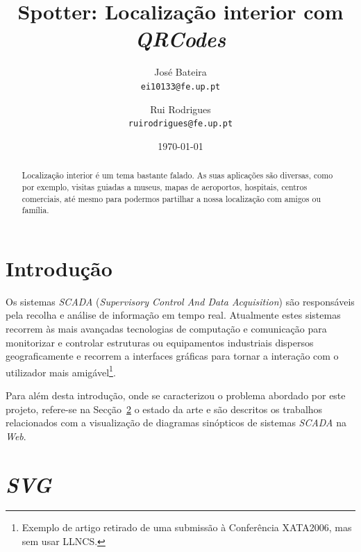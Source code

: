 \documentclass[twocolumn,twoside,11pt]{article}
\title{\vspace{-15mm}\fontsize{24pt}{10pt}\selectfont\textbf{
  Spotter: Localização interior com \emph{QRCodes}
}} %
\author{José Bateira\\
\small \texttt{ei10133@fe.up.pt}\\
\and
Rui Rodrigues\\
\small \texttt{ruirodrigues@fe.up.pt}
\vspace{-5mm}
}
\date{\today}
\newcommand{\class}[1]{{\normalfont\slshape #1\/}}
\newcommand{\svg}{\class{SVG}}
\newcommand{\scada}{\class{SCADA}}
\begin{document}
\maketitle
\thispagestyle{plain}            %


\begin{abstract}
Localização interior é um tema bastante falado. 
As suas aplicações são diversas, como por exemplo, visitas guiadas a museus, mapas de aeroportos, hospitais, centros comerciais, até mesmo para podermos partilhar a nossa localização com amigos ou família.



\end{abstract}


\section{Introdução}\label{sec:intro}

Os sistemas \scada{} (\emph{Supervisory Control And Data Acquisition})
são responsáveis pela recolha e análise de informação em tempo real.
Atualmente estes sistemas recorrem às mais avançadas tecnologias de
computação e comunicação para monitorizar e controlar estruturas ou
equipamentos industriais dispersos geograficamente e recorrem a
interfaces gráficas para tornar a interação com o utilizador mais
amigável\footnote{Exemplo de artigo retirado de uma submissão à
  Conferência XATA2006, mas sem usar LLNCS.}.

\lipsum[2]

Para além desta introdução, onde se caracterizou o problema abordado
por este projeto, refere-se na Secção~\ref{sec:sota} o
estado da arte e são descritos os trabalhos relacionados com a
visualização de diagramas sinópticos de sistemas \scada{} na
\textit{Web}. 


\section{\svg}\label{sec:sota}
\end{document}

